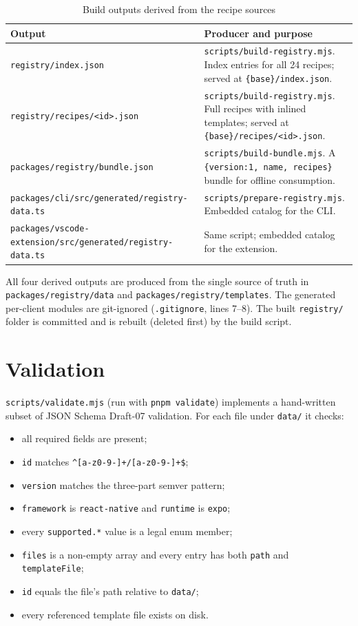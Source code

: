 \begin{longtable}{p{4.6cm}p{9.4cm}}
\caption{Build outputs derived from the recipe sources}\\
\toprule
\textbf{Output} & \textbf{Producer and purpose} \\
\midrule

\texttt{registry/index.json} & \texttt{scripts/build-registry.mjs}. Index entries for
all 24 recipes; served at \texttt{\{base\}/index.json}. \\
\texttt{registry/recipes/<id>.json} & \texttt{scripts/build-registry.mjs}. Full
recipes with inlined templates; served at \texttt{\{base\}/recipes/<id>.json}. \\
\texttt{packages/registry/bundle.json} & \texttt{scripts/build-bundle.mjs}. A
\texttt{\{version:1, name, recipes\}} bundle for offline consumption. \\
\texttt{packages/cli/src/generated/registry-data.ts} & \texttt{scripts/prepare-registry.mjs}.
Embedded catalog for the CLI. \\
\texttt{packages/vscode-extension/src/generated/registry-data.ts} & Same script;
embedded catalog for the extension. \\
\bottomrule
\end{longtable}

All four derived outputs are produced from the single source of truth in
\texttt{packages/registry/data} and \texttt{packages/registry/templates}. The
generated per-client modules are git-ignored
(\texttt{.gitignore}, lines 7--8). The built \texttt{registry/} folder is committed
and is rebuilt (deleted first) by the build script.

\section{Validation}

\texttt{scripts/validate.mjs} (run with \texttt{pnpm validate}) implements a
hand-written subset of JSON Schema Draft-07 validation. For each file under
\texttt{data/} it checks:

\begin{itemize}
  \item all required fields are present;
  \item \texttt{id} matches \texttt{\^{}[a-z0-9-]+/[a-z0-9-]+\$};
  \item \texttt{version} matches the three-part semver pattern;
  \item \texttt{framework} is \texttt{react-native} and \texttt{runtime} is
        \texttt{expo};
  \item every \texttt{supported.*} value is a legal enum member;
  \item \texttt{files} is a non-empty array and every entry has both \texttt{path}
        and \texttt{templateFile};
  \item \texttt{id} equals the file's path relative to \texttt{data/};
  \item every referenced template file exists on disk.
\end{itemize}

